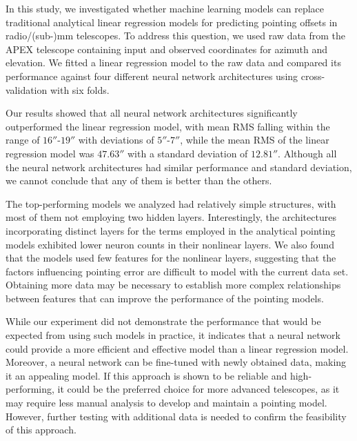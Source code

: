 In this study, we investigated whether machine learning models can replace traditional analytical linear regression models for predicting pointing offsets in radio/(sub-)mm telescopes.
To address this question, we used raw data from the APEX telescope containing input and observed coordinates for azimuth and elevation.
We fitted a linear regression model to the raw data and compared its performance against four different neural network architectures using cross-validation with six folds.

Our results showed that all neural network architectures significantly outperformed the linear regression model, with mean RMS falling within the range of $16''$-$19''$ with deviations of $5''$-$7''$, while the mean RMS of the linear regression model was $47.63''$ with a standard deviation of $12.81''$.
Although all the neural network architectures had similar performance and standard deviation, we cannot conclude that any of them is better than the others.

The top-performing models we analyzed had relatively simple structures, with most of them not employing two hidden layers.
Interestingly, the architectures incorporating distinct layers for the terms employed in the analytical pointing models exhibited lower neuron counts in their nonlinear layers.
We also found that the models used few features for the nonlinear layers, suggesting that the factors influencing pointing error are difficult to model with the current data set.
Obtaining more data may be necessary to establish more complex relationships between features that can improve the performance of the pointing models.

While our experiment did not demonstrate the performance that would be expected from using such models in practice, it indicates that a neural network could provide a more efficient and effective model than a linear regression model.
Moreover, a neural network can be fine-tuned with newly obtained data, making it an appealing model.
If this approach is shown to be reliable and high-performing, it could be the preferred choice for more advanced telescopes, as it may require less manual analysis to develop and maintain a pointing model.
However, further testing with additional data is needed to confirm the feasibility of this approach.


